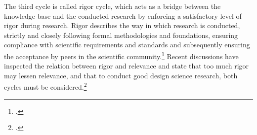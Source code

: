 The third cycle is called rigor cycle, which acts as a bridge between the knowledge base and the conducted research by enforcing a satisfactory level of rigor during research. Rigor describes the way in which research is conducted, strictly and closely following formal methodologies and foundations, ensuring compliance with scientific requirements and standards and subsequently ensuring the acceptance by peers in the scientific community.\footcites[Cf.][p.130]{ThomasBekannteundweniger2014} Recent discussions have inspected the relation between rigor and relevance and state that too much rigor may lessen relevance, and that to conduct good design science research, both cycles must be considered.\footcites[Cf.][p.5]{BenbasatEmpiricalresearchinformation1999}[cf.][p.88]{HevnerDesignScienceResearch2004}[cf.][p.130]{ThomasBekannteundweniger2014}[cf.][p.91]{Hevnerthreecycleview2007}
